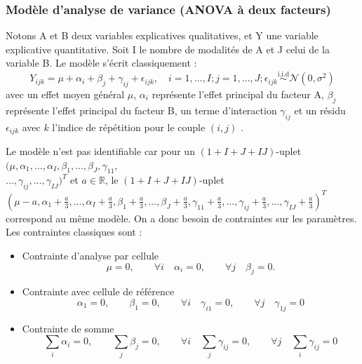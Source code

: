 \documentclass[12pt,a4paper]{article}
\begin{document}
	\subsubsection{Modèle d'analyse de variance (ANOVA à deux facteurs)}
	\begin{mdframed}[backgroundcolor=gray!20, hidealllines=true, innermargin=10pt, outermargin=10pt, skipabove=10pt, skipbelow=10pt, nobreak=true]
			Notons A et B deux variables explicatives qualitatives, et Y une variable explicative quantitative. Soit I le nombre de modalités de A et J celui de la variable B.
		Le modèle s'écrit classiquement :
		\begin{equation*}
			Y_{ijk} = \mu + \alpha_i + \beta_j + \gamma_{ij} + \epsilon_{ijk}, \quad i = 1, \ldots, I; j = 1, \ldots, J;  \epsilon_{ijk} \overset{\text{i.i.d}}{\sim} \mathcal{N}(0,\sigma^2)
		\end{equation*}
		avec un effet moyen général $\mu$, $\alpha_i$ représente l'effet principal du facteur A, $\beta_j$ représente l'effet principal du facteur B, un terme d'interaction $\gamma_{ij}$ et un résidu $\epsilon_{ijk}$ avec $k$ l'indice de répétition pour le couple $(i,j)$ \cite{daudin}.
	\end{mdframed}
	Le modèle n'est pas identifiable car pour un $(1+I+J+IJ)$-uplet $(\mu,\alpha_1,...,\alpha_I,\beta_1,...,\beta_J,\gamma_{11},$\\$..., \gamma_{ij},...,\gamma_{IJ})^T$ et $a \in \mathbb{R}$, le $(1+I+J+IJ)$-uplet $(\mu-a,\alpha_1+\frac{a}{3},...,\alpha_I+\frac{a}{3},\beta_1+\frac{a}{3},...,\beta_J+\frac{a}{3},\gamma_{11}+\frac{a}{3},...,\gamma_{ij}+\frac{a}{3},...,\gamma_{IJ}+\frac{a}{3})^T$ correspond au même modèle. On a donc besoin de contraintes sur les paramètres.\\
	
	Les contraintes classiques sont \cite{cornillon2022regression}: 
	\begin{itemize}[label=--, leftmargin=*]
		\item Contrainte d'analyse par cellule
		\begin{equation*}
			\mu=0,\quad\quad \forall i \quad  \alpha_i=0, \quad\quad \forall  j  \quad \beta_j=0.
		\end{equation*}
		\item Contrainte avec cellule de référence
		\begin{equation*}
			\alpha_1=0,\quad\quad \beta_1=0,\quad\quad \forall i\quad \gamma_{i1}=0,\quad\quad \forall j \quad \gamma_{1j}=0
		\end{equation*}
		\item Contrainte de somme
		\begin{equation*}
			\sum_{i}\alpha_i=0,\quad\quad\sum_{j}\beta_j=0,\quad\quad\forall i \quad \sum_{j}\gamma_{ij}=0,\quad\quad\forall j \quad\sum_{i}\gamma_{ij}=0
		\end{equation*}
	\end{itemize}
	
\end{document}
